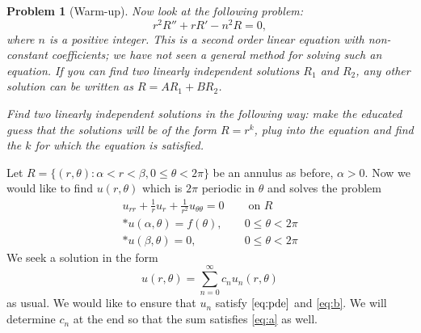 \documentclass[11pt]{article}
\renewcommand{\a}{\alpha}
\renewcommand{\b}{\beta}
\renewcommand{\th}{\theta}
\newtheorem{problem}{Problem}
\begin{document}
\begin{problem}[Warm-up]\label{prob:3}
    Now look at the following problem:
    \begin{equation}
        r^2 R''+r R'-n^2 R=0,\label{eq:prob2}
    \end{equation}
    where $n$ is a positive integer.
    This is a second order linear equation with non-constant coefficients; we have not seen a general method for solving such an equation. 
    If you can find two linearly independent solutions $R_1$ and $R_2$, any other solution can be written as $R=AR_1+BR_2$.

    Find two linearly independent solutions in the following way: make the educated guess that the solutions will be of the form $R=r^k$, plug into the equation and find the $k$ for which the equation is satisfied.
\end{problem}

Let $R=\{(r,\theta):\alpha <r<\b , 0\leq \theta <2\pi \}$ be an annulus as before, $\a>0$.
Now we would like to find $u(r,\th)$ which is $2\pi$ periodic in $\theta$ and solves the problem 
     \begin{align}
         u_{rr}+\frac{1}{r}u_r+\frac{1}{r^2}u_{\th\th}=0&\quad \text{ on }R\label{eq:pde}\\*
         u(\a,\th)=f(\th),&\quad  0\leq \th< 2\pi\label{eq:a}\\*
         u(\b,\th)=0, &\quad 0\leq \th< 2\pi\label{eq:b}
     \end{align}
 We seek a solution in the form $$u(r,\th)=\sum_{n=0}^\infty c_n u_n(r,\th)$$ as usual.
 We would like to ensure that $u_n$ satisfy $\eqref{eq:pde}$ and \eqref{eq:b}.
 We will determine $c_n$ at the end so that the sum satisfies \eqref{eq:a} as well.
 
\end{document}
